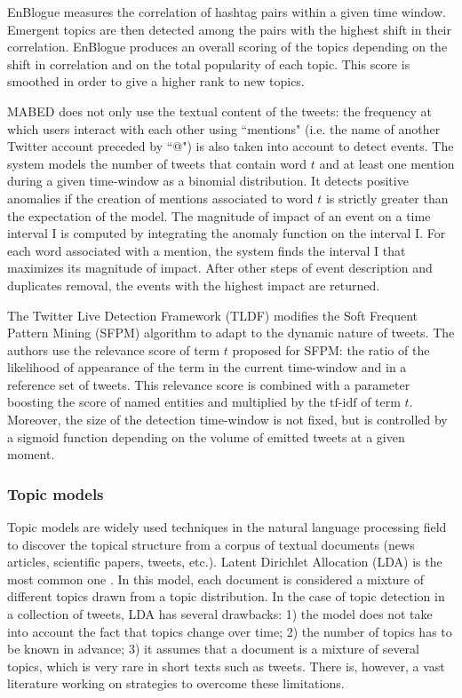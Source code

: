 		EnBlogue \citep{alvanaki_see_2012} measures the correlation of hashtag pairs within a given time window. Emergent topics are then detected among the pairs with the highest shift in their correlation. EnBlogue produces an overall scoring of the topics depending on the shift in correlation and on the total popularity of each topic. This score is smoothed in order to give a higher rank to new topics. 
		
		MABED \citep{guille_event_2015} does not only use the textual content of the tweets: the frequency at which users interact with each other using ``mentions" (i.e. the name of another Twitter account preceded by ``@") is also taken into account to detect events. The system models the number of tweets that contain word $t$ and at least one mention during a given time-window as a binomial distribution. It detects positive anomalies if the creation of mentions associated to word $t$ is strictly greater than the expectation of the model. The magnitude of impact of an event on a time interval I is computed by integrating the anomaly function on the interval I. For each word associated with a mention, the system finds the interval I that maximizes its magnitude of impact. After other steps of event description and duplicates removal, the events with the highest impact are returned.
		
		The Twitter Live Detection Framework (TLDF) \citep{gaglio_framework_2016} modifies the Soft Frequent Pattern Mining (SFPM) algorithm \citep{petkos_soft_2014} to adapt to the dynamic nature of tweets. The authors use the relevance score of term $t$ proposed for SFPM: the ratio of the likelihood of appearance of the term in the current time-window and in a reference set of tweets. This relevance score is combined with a parameter boosting the score of named entities and multiplied by the $\mbox{tf-idf}$ of term $t$. Moreover, the size of the detection time-window is not fixed, but is controlled by a sigmoid function depending on the volume of emitted tweets at a given moment.
	
	\subsubsection{Topic models} 
	\label{topic models}
	Topic models are widely used techniques in the natural language processing field to discover the topical structure from a corpus of textual documents (news articles, scientific papers, tweets, etc.). Latent Dirichlet Allocation (LDA) is the most common one \citep{blei_latent_2003}. In this model, each document is considered a mixture of different topics drawn from a topic distribution. In the case of topic detection in a collection of tweets, LDA has several drawbacks: 1) the model does not take into account the fact that topics change over time; 2) the number of topics has to be known in advance; 3) it assumes that a document is a mixture of several topics, which is very rare in short texts such as tweets. There is, however, a vast literature working on strategies to overcome these limitations.
	
